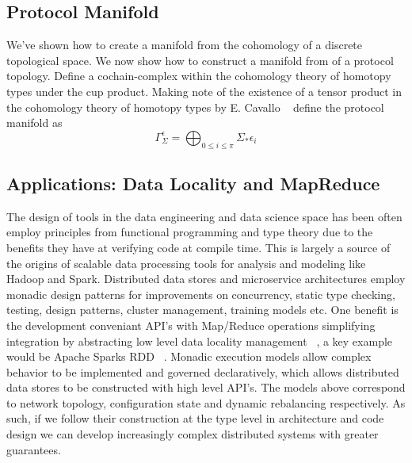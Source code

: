 \documentclass[runningheads]{llncs}
\begin{document}
\subsection{Protocol Manifold}
We've shown how to create a manifold from the cohomology of a discrete topological space. We now show how to construct a manifold from of a protocol topology. Define a cochain-complex within the cohomology theory of homotopy types under the cup product. Making note of the existence of a tensor product in the cohomology theory of homotopy types by E. Cavallo ~\cite{ref_article9} define the protocol manifold as 
\begin{equation}
\Gamma^\epsilon_{\Sigma} = \bigoplus_{0 \leq i \leq \pi} \Sigma_* \epsilon_i
\end{equation}

\subsection{Applications: Data Locality and MapReduce}

The design of tools in the data engineering and data science space has been often employ principles from functional programming and type theory due to the benefits they have at verifying code at compile time. This is largely a source of the origins of scalable data processing tools for analysis and modeling like Hadoop and Spark. Distributed data stores and microservice architectures employ monadic design patterns for improvements on concurrency, static type checking, testing, design patterns, cluster management, training models etc. One benefit is the development conveniant API's with Map/Reduce operations simplifying integration by abstracting low level data locality management ~\cite{ref_book2}, a key example would be Apache Sparks RDD ~\cite{ref_url1}. Monadic execution models allow complex behavior to be implemented and governed declaratively, which allows distributed data stores to be constructed with high level API's. The models above correspond to network topology, configuration state and dynamic rebalancing respectively. As such, if we follow their construction at the type level in architecture and code design we can develop increasingly complex distributed systems with greater guarantees. 
\end{document}
